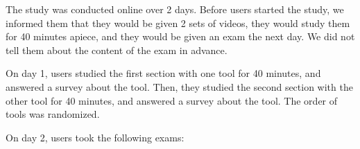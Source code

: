\documentclass{sigchi}
\begin{document}
The study was conducted online over 2 days. Before users started the study, we informed them that they would be given 2 sets of videos, they would study them for 40 minutes apiece, and they would be given an exam the next day. We did not tell them about the content of the exam in advance. %



On day 1, users studied the first section with one tool for 40 minutes, and answered a survey about the tool. Then, they studied the second section with the other tool for 40 minutes, and answered a survey about the tool. The order of tools was randomized. %




On day 2, users took the following exams:
\end{document}
